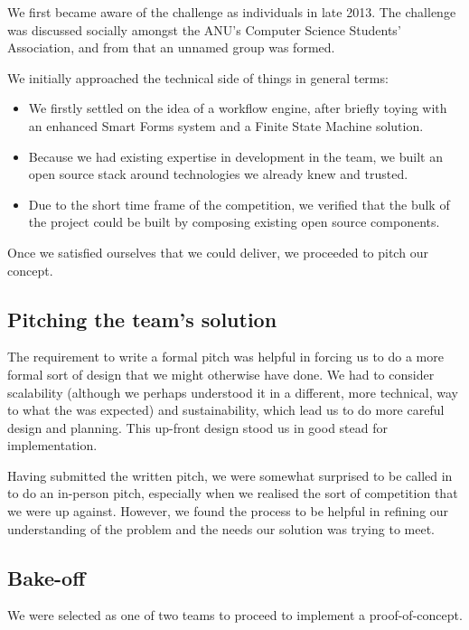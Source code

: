 \documentclass[12pt,a4paper,twosided]{article}
\begin{document}
We first became aware of the challenge as individuals in late 2013. The
challenge was discussed socially amongst the ANU's Computer Science
Students' Association, and from that an unnamed group was formed.

We initially approached the technical side of things in general terms:

\begin{itemize}

\item
  We firstly settled on the idea of a workflow engine, after briefly
  toying with an enhanced Smart Forms system and a Finite State Machine
  solution.
\item
  Because we had existing expertise in development in the team, we built
  an open source stack around technologies we already knew and
  trusted.
\item
  Due to the short time frame of the competition, we verified that the
  bulk of the project could be built by composing existing open source
  components.
\end{itemize}

Once we satisfied ourselves that we could deliver, we proceeded to pitch
our concept.

\subsection{Pitching the team's solution}

The requirement to write a formal pitch was helpful in forcing us to do
a more formal sort of design that we might otherwise have done. We had
to consider scalability (although we perhaps understood it in a
different, more technical, way to what the was expected) and
sustainability, which lead us to do more careful design and planning.
This up-front design stood us in good stead for implementation.

Having submitted the written pitch, we were somewhat surprised to be
called in to do an in-person pitch, especially when we realised the sort
of competition that we were up against. However, we found the process to
be helpful in refining our understanding of the problem and the needs
our solution was trying to meet.

\subsection{Bake-off}

We were selected as one of two teams to proceed to implement a
proof-of-concept.
\end{document}

